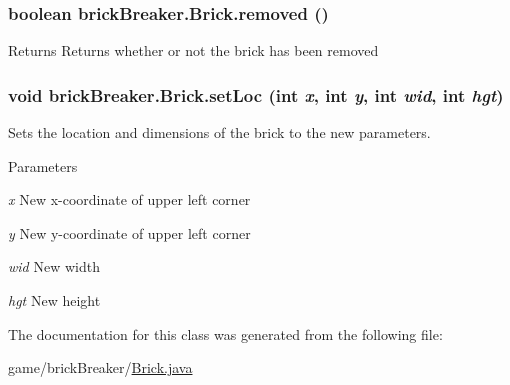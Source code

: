 \hypertarget{classbrick_breaker_1_1_brick_ac333dcbd252242dc78ece37b8a661ce0}{
\subsubsection[{removed}]{\setlength{\rightskip}{0pt plus 5cm}boolean brickBreaker.Brick.removed ()}}
\label{classbrick_breaker_1_1_brick_ac333dcbd252242dc78ece37b8a661ce0}
\begin{DoxyReturn}{Returns}
Returns whether or not the brick has been removed 
\end{DoxyReturn}
\hypertarget{classbrick_breaker_1_1_brick_a6f9ff21504eab68a2b9b9e6a87ed0f52}{
\subsubsection[{setLoc}]{\setlength{\rightskip}{0pt plus 5cm}void brickBreaker.Brick.setLoc (int {\em x}, \/  int {\em y}, \/  int {\em wid}, \/  int {\em hgt})}}
\label{classbrick_breaker_1_1_brick_a6f9ff21504eab68a2b9b9e6a87ed0f52}
Sets the location and dimensions of the brick to the new parameters.


\begin{DoxyParams}{Parameters}
\item[{\em x}]New x-\/coordinate of upper left corner \item[{\em y}]New y-\/coordinate of upper left corner \item[{\em wid}]New width \item[{\em hgt}]New height \end{DoxyParams}


The documentation for this class was generated from the following file:\begin{DoxyCompactItemize}
\item 
game/brickBreaker/\hyperlink{_brick_8java}{Brick.java}\end{DoxyCompactItemize}
